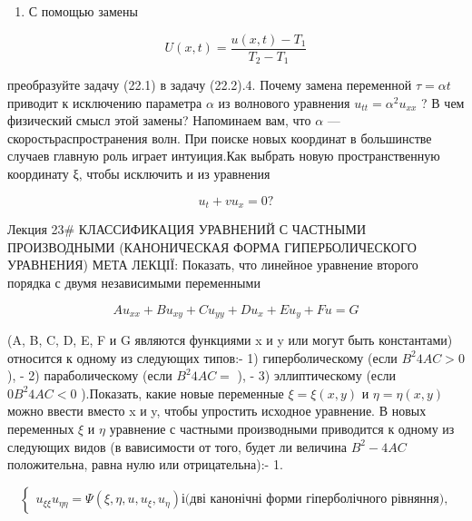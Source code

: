 \documentclass[
  ukrainian,
]{article}
\providecommand{\tightlist}{%
  \setlength{\itemsep}{0pt}\setlength{\parskip}{0pt}}
\begin{document}
\begin{enumerate}
\def\labelenumi{\arabic{enumi}.}
\setcounter{enumi}{2}
\tightlist
\item
  С помощью замены
\end{enumerate}

\[
U(x, t) = \frac{u(x, t) - T_1}{T_2 - T_1}
\]

преобразуйте задачу (22.1) в задачу (22.2).4. Почему замена переменной
\(\tau = \alpha t\) приводит к исключению параметра \(\alpha\) из
волнового уравнения \(u_{tt} = \alpha^2 u_{xx}\) ? В чем физический
смысл этой замены? Напоминаем вам, что \(\alpha\)
---скоростьраспространения волн. При поиске новых координат в
большинстве случаев главную роль играет интуиция.Как выбрать новую
пространственную координату ξ, чтобы исключить и из уравнения

\[
u_t + vu_x = 0?
\]

Лекция 23\# КЛАССИФИКАЦИЯ УРАВНЕНИЙ С ЧАСТНЫМИ ПРОИЗВОДНЫМИ
(КАНОНИЧЕСКАЯ ФОРМА ГИПЕРБОЛИЧЕСКОГО УРАВНЕНИЯ) МЕТА ЛЕКЦІЇ: Показать,
что линейное уравнение второго порядка с двумя независимыми переменными

\[
Au_{xx} + Bu_{xy} + Cu_{yy} + Du_x + Eu_y + Fu = G
\]

(A, B, C, D, E, F и G являются функциями x и y или могут быть
константами) относится к одному из следующих типов:- 1) гиперболическому
(если \(B^2 4AC > 0\) ), - 2) параболическому (если \(B^2 4AC =\) ), -
3) эллиптическому (если \(0 B^2 4AC < 0\) ).Показать, какие новые
переменные \(\xi = \xi(x, y)\) и \(\eta = \eta(x, y)\) можно ввести
вместо x и y, чтобы упростить исходное уравнение. В новых переменных
\(\xi\) и \(\eta\) уравнение с частными производными приводится к одному
из следующих видов (в вависимости от того, будет ли величина
\(B^2 - 4AC\) положительна, равна нулю или отрицательна):- 1.

\[
\begin{cases} u_{\xi\xi} u_{\eta\eta} = \Psi(\xi,  \eta, u, u_{\xi}, u_{\eta}) і \text{(дві канонічні форми гіперболічного рівняння),} \end{cases}
\]
\end{document}
